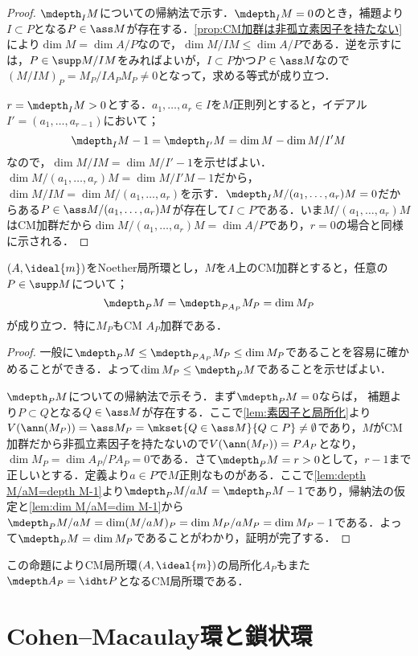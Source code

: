 \begin{proof}
	$\mdepth_I M$についての帰納法で示す．$\mdepth_I M=0$のとき，補題より$I\subset P$となる$P\in\ass M$が存在する．\ref{prop:CM加群は非孤立素因子を持たない}により$\dim M=\dim A/P$なので，$\dim M/IM\leq\dim A/P$である．逆を示すには，$P\in\supp M/IM$をみればよいが，$I\subset P$かつ$P\in\ass M$なので$(M/IM)_P=M_P/IA_PM_P\neq 0$となって，求める等式が成り立つ．
	
	$r=\mdepth_I M>0$とする．$a_1,\dots,a_r\in I$を$M$正則列とすると，イデアル$I'=(a_1,\dots,a_{r-1})$において；
	\[\mdepth_I M-1=\mdepth_{I'}M=\dim M-\dim M/I'M\]
	なので，$\dim M/IM=\dim M/I'-1$を示せばよい．$\dim M/(a_1,\dots,a_r)M=\dim M/I'M-1$だから，$\dim M/IM=\dim M/(a_1,\dots,a_r)$を示す．$\mdepth_I M/(a_1,\dots,a_r)M=0$だからある$P\in\ass M/(a_1,\dots,a_r)M$が存在して$I\subset P$である．いま$M/(a_1,\dots,a_r)M$はCM加群だから$\dim M/(a_1,\dots,a_r)M=\dim A/P$であり，$r=0$の場合と同様に示される．
\end{proof}

\begin{prop}\label{prop:CMの局所化もCM}
	$(A,\ideal{m})$をNoether局所環とし，$M$を$A$上のCM加群とすると，任意の$P\in\supp M$について；
	\[\mdepth_P M=\mdepth_{PA_P} M_P=\dim M_P\]
	が成り立つ．特に$M_P$もCM $A_P$加群である．
\end{prop}

\begin{proof}
	一般に$\mdepth_P M\leq\mdepth_{PA_P}M_P\leq\dim M_P$であることを容易に確かめることができる．よって$\dim M_P\leq\mdepth_P M$であることを示せばよい．
	
	$\mdepth_P M$についての帰納法で示そう．まず$\mdepth_P M=0$ならば，
	補題より$P\subset Q$となる$Q\in\ass M$が存在する．ここで\ref{lem:素因子と局所化}より$V(\ann (M_P))=\ass M_P=\mkset{Q\in\ass M}{Q\subset P}\neq\emptyset$であり，$M$がCM加群だから非孤立素因子を持たないので$V(\ann(M_P))=PA_P$となり，$\dim M_P=\dim A_P/PA_P=0$である．さて$\mdepth_P M=r>0$として，$r-1$まで正しいとする．定義より$a\in P$で$M$正則なものがある．ここで\ref{lem:depth M/aM=depth M-1}より$\mdepth_P M/aM=\mdepth_P M-1$であり，帰納法の仮定と\ref{lem:dim M/aM=dim M-1}から$\mdepth_P M/aM=\dim (M/aM)_P=\dim M_P/aM_P=\dim M_P-1$である．よって$\mdepth_P M=\dim M_P$であることがわかり，証明が完了する．	
\end{proof}

この命題によりCM局所環$(A,\ideal{m})$の局所化$A_P$もまた$\mdepth A_P=\idht P$となるCM局所環である．
\section{Cohen--Macaulay環と鎖状環}

